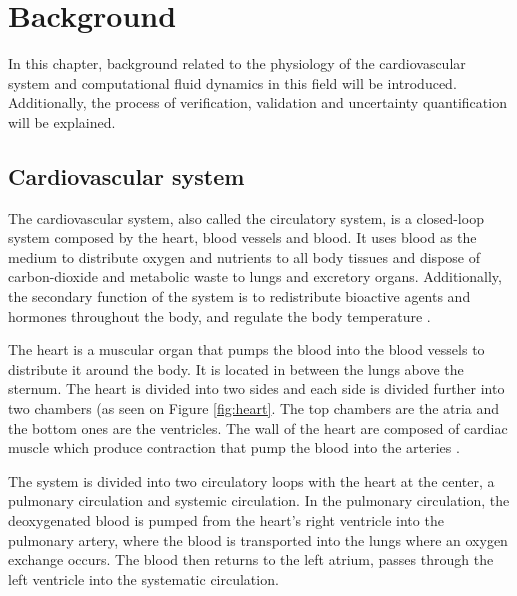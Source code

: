\chapter{Background}
\label{chapterlabel2}
In this chapter, background related to the physiology of the cardiovascular system and computational fluid dynamics in this field will be introduced. Additionally, the process of verification, validation and uncertainty quantification will be explained.


\section{Cardiovascular system}
The cardiovascular system, also called the circulatory system, is a closed-loop system composed by the heart, blood vessels and blood. It uses blood as the medium to distribute oxygen and nutrients to all body tissues and dispose of carbon-dioxide and metabolic waste to lungs and excretory organs. Additionally, the secondary function of the system is to redistribute bioactive agents and hormones throughout the body, and regulate the body temperature \cite{Levick2010Introduction5ed}.\par

The heart is a muscular organ that  pumps the blood into the blood vessels to distribute it around the body. It is located in between the lungs above the sternum. The heart is divided into two sides and each side is divided further into two chambers (as seen on Figure \ref{fig:heart}. The top chambers are the atria and the bottom ones are the ventricles. The wall of the heart are composed of cardiac muscle which produce contraction that pump the blood into the arteries \cite{aaronson2012cardiovascular,tortora2017introduction}. \par

The system is divided into two circulatory loops with the heart at the center, a pulmonary circulation and systemic circulation. In the pulmonary circulation, the deoxygenated blood is pumped from the heart's right ventricle into the pulmonary artery, where the blood is transported into the lungs where an oxygen exchange occurs. The blood then returns to the left atrium, passes through the left ventricle into the systematic circulation\cite{Levick2010Introduction5ed,tortora2017introduction}. \par


